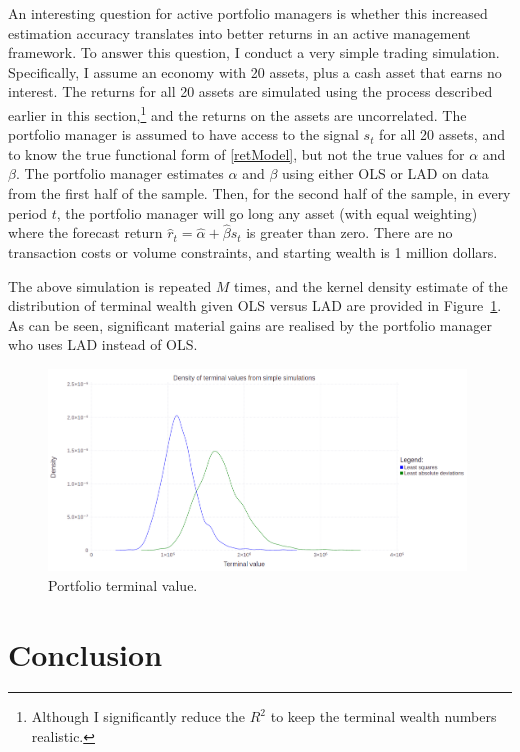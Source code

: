 \documentclass[12pt,a4paper]{amsart}
\renewcommand{\a}{\alpha}
\renewcommand{\b}{\beta}
\begin{document}
An interesting question for active portfolio managers is whether this increased estimation accuracy translates into better returns in an active management framework. To answer this question, I conduct a very simple trading simulation. Specifically, I assume an economy with 20 assets, plus a cash asset that earns no interest. The returns for all 20 assets are simulated using the process described earlier in this section,\footnote{Although I significantly reduce the $R^2$ to keep the terminal wealth numbers realistic.} and the returns on the assets are uncorrelated. The portfolio manager is assumed to have access to the signal $s_t$ for all 20 assets, and to know the true functional form of \eqref{retModel}, but not the true values for $\a$ and $\b$. The portfolio manager estimates $\a$ and $\b$ using either OLS or LAD on data from the first half of the sample. Then, for the second half of the sample, in every period $t$, the portfolio manager will go long any asset (with equal weighting) where the forecast return $\hat{r}_t = \hat{\a} + \hat{\b} s_t$ is greater than zero. There are no transaction costs or volume constraints, and starting wealth is 1 million dollars.

The above simulation is repeated $M$ times, and the kernel density estimate of the distribution of terminal wealth given OLS versus LAD are provided in Figure~\ref{figTradingSimTerminalVal}. As can be seen, significant material gains are realised by the portfolio manager who uses LAD instead of OLS.

\begin{figure}[htbp]
\centering
\includegraphics[height=5.35cm]{TradingSimTerminalVal.png}
\caption{\footnotesize{Portfolio terminal value.}}
\label{figTradingSimTerminalVal}
\end{figure}






\section{Conclusion}
\end{document}
